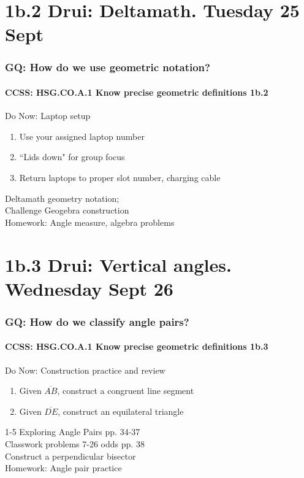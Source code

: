 \documentclass{beamer}
\begin{document}
\section{1b.2 Drui: Deltamath. Tuesday 25 Sept}
  \frame
  {
    \frametitle{GQ: How do we use geometric notation?}
    \framesubtitle{CCSS: HSG.CO.A.1 Know precise geometric definitions  \alert{1b.2}}

    \begin{block}{Do Now: Laptop setup}
    \begin{enumerate}
        \item Use your assigned laptop number
        \item ``Lids down" for group focus
        \item Return laptops to proper slot number, charging cable
    \end{enumerate}
    \end{block}
    Deltamath geometry notation; \\Challenge Geogebra construction\\
    \vspace{1cm}
    Homework: Angle measure, algebra problems
  }

\section{1b.3 Drui: Vertical angles. Wednesday Sept 26}
  \frame
  {
    \frametitle{GQ: How do we classify angle pairs?}
    \framesubtitle{CCSS: HSG.CO.A.1 Know precise geometric definitions  \alert{1b.3}}

    \begin{block}{Do Now: Construction practice and review}
    \begin{enumerate}
        \item Given $\overline{AB}$, construct a congruent line segment
        \item Given $\overline{DE}$, construct an equilateral triangle
    \end{enumerate}
    \end{block}
    1-5 Exploring Angle Pairs pp. 34-37\\
    Classwork problems 7-26 odds pp. 38\\
    Construct a perpendicular bisector \\
    \vspace{0.5cm}
    Homework: Angle pair practice
  }
\end{document}
